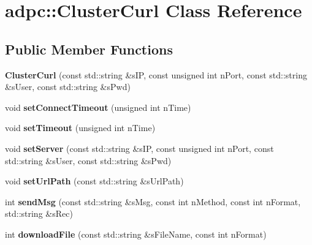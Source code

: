 \hypertarget{classadpc_1_1ClusterCurl}{}\section{adpc\+:\+:Cluster\+Curl Class Reference}
\label{classadpc_1_1ClusterCurl}
\subsection*{Public Member Functions}
\begin{DoxyCompactItemize}
\item 
\mbox{\label{classadpc_1_1ClusterCurl_a2878a4c0f97721ee58a5f06055b953cc}} 
{\bfseries Cluster\+Curl} (const std\+::string \&s\+IP, const unsigned int n\+Port, const std\+::string \&s\+User, const std\+::string \&s\+Pwd)
\item 
\mbox{\label{classadpc_1_1ClusterCurl_a1e0b63436bd019090ce56ec7d3a50bcf}} 
void {\bfseries set\+Connect\+Timeout} (unsigned int n\+Time)
\item 
\mbox{\label{classadpc_1_1ClusterCurl_ac19296f69f3278c01fe4e3acadff701b}} 
void {\bfseries set\+Timeout} (unsigned int n\+Time)
\item 
\mbox{\label{classadpc_1_1ClusterCurl_a8a4e4a7f681b4db03a722efdb6a3a28e}} 
void {\bfseries set\+Server} (const std\+::string \&s\+IP, const unsigned int n\+Port, const std\+::string \&s\+User, const std\+::string \&s\+Pwd)
\item 
\mbox{\label{classadpc_1_1ClusterCurl_a1e70fc0ed8b8437069e3522b8cb4ab34}} 
void {\bfseries set\+Url\+Path} (const std\+::string \&s\+Url\+Path)
\item 
\mbox{\label{classadpc_1_1ClusterCurl_a93c88c9d2a0e6291fedfec414454d485}} 
int {\bfseries send\+Msg} (const std\+::string \&s\+Msg, const int n\+Method, const int n\+Format, std\+::string \&s\+Rec)
\item 
\mbox{\label{classadpc_1_1ClusterCurl_a67c43148e9a035d0805bf1f036ff1fa0}} 
int {\bfseries download\+File} (const std\+::string \&s\+File\+Name, const int n\+Format)

\end{DoxyCompactItemize}
